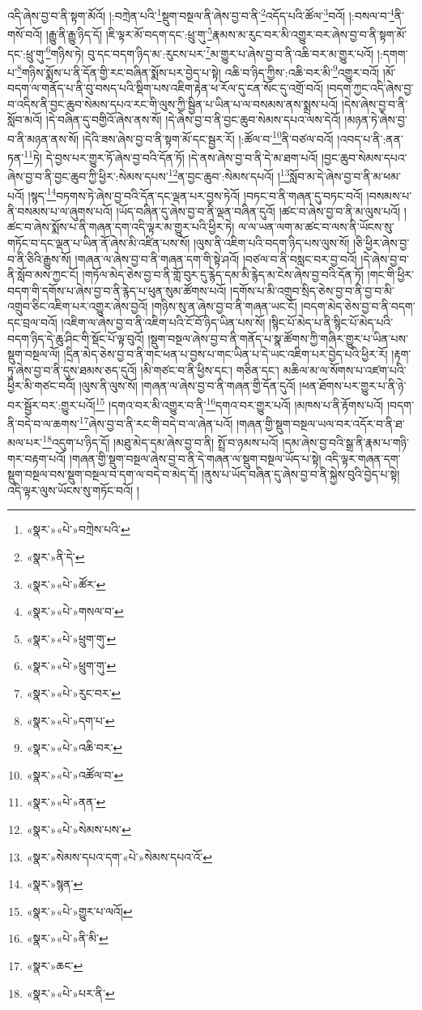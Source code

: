 འདི་ཞེས་བྱ་བ་ནི་སྟག་མོའོ། །:བཀྲེན་པའི་\footnote{«སྣར་»«པེ་»བཀྲེས་པའི་}སྡུག་བསྔལ་ནི་ཞེས་བྱ་བ་ནི་\footnote{«སྣར་»ནི་དེ་}འདོད་པའི་ཚོལ་\footnote{«སྣར་»«པེ་»ཚོར་}བའོ། །:བསལ་བ་\footnote{«སྣར་»«པེ་»གསལ་བ་}ནི་གསོ་བའོ། །རྒྱུ་ནི་རྒྱུ་ཉིད་དོ། །ཇི་ལྟར་མོ་བདག་དང་:ཕྲུ་གུ་\footnote{«སྣར་»«པེ་»ཕྲུག་གུ་}རྣམས་མ་རུང་བར་མི་འགྱུར་བར་ཞེས་བྱ་བ་ནི་སྟག་མོ་དང་:ཕྲུ་གུ་\footnote{«སྣར་»«པེ་»ཕྲུག་གུ་}གཉིས་ཏེ། བུ་དང་བདག་ཉིད་མ་:རུངས་པར་\footnote{«སྣར་»«པེ་»རུང་བར་}མ་གྱུར་པ་ཞེས་བྱ་བ་ནི་འཆི་བར་མ་གྱུར་པའོ། །:དགག་པ་\footnote{«སྣར་»«པེ་»དག་པ་}གཉིས་སྨོས་པ་ནི་དོན་གྱི་རང་བཞིན་སྨོས་པར་བྱེད་པ་སྟེ། འཆི་བ་ཉིད་ཀྱིས་:འཆི་བར་མི་\footnote{«སྣར་»«པེ་»འཆི་བར་}འགྱུར་བའོ། །མོ་བདག་ལ་གནོད་པ་ནི་བུ་བསད་པའི་སྡིག་པས་འཇིག་རྟེན་ཕ་རོལ་དུ་ངན་སོང་དུ་འགྲོ་བའོ། །བདག་ཀྱང་འདི་ཞེས་བྱ་བ་འདིས་ནི་བྱང་ཆུབ་སེམས་དཔའ་རང་གི་ལུས་ཀྱི་སྦྱིན་པ་ཡིན་པ་ལ་བསམས་ནས་སྨྲས་པའོ། །དེས་ཞེས་བྱ་བ་ནི་སློབ་མའོ། །དེ་བཞིན་དུ་བགྱིའོ་ཞེས་ནས་སོ། །དེ་ཞེས་བྱ་བ་ནི་བྱང་ཆུབ་སེམས་དཔའ་ལས་དེའོ། །མཉན་ཏེ་ཞེས་བྱ་བ་ནི་མཉན་ནས་སོ། །དེའི་ཟས་ཞེས་བྱ་བ་ནི་སྟག་མོ་དང་སྦྱར་རོ། །:ཚོལ་བ་\footnote{«སྣར་»«པེ་»འཚོལ་བ་}ནི་བཙལ་བའོ། །འབད་པ་ནི་:ནན་ཏན་\footnote{«སྣར་»«པེ་»ནན་}ཏེ། དེ་བྱས་པར་གྱུར་ཏོ་ཞེས་བྱ་བའི་དོན་ཏོ། །དེ་ནས་ཞེས་བྱ་བ་ནི་དེ་མ་ཐག་པའོ། །བྱང་ཆུབ་སེམས་དཔའ་ཞེས་བྱ་བ་ནི་བྱང་ཆུབ་ཀྱི་ཕྱིར་:སེམས་དཔས་\footnote{«སྣར་»«པེ་»སེམས་པས་}ན་བྱང་ཆུབ་:སེམས་དཔའོ། །\footnote{«སྣར་»སེམས་དཔའ་དག་«པེ་»སེམས་དཔའ་འོ་}སློབ་མ་དེ་ཞེས་བྱ་བ་ནི་མ་ཕམ་པའོ། །སྙད་\footnote{«སྣར་»སྙན་}བཏགས་ཏེ་ཞེས་བྱ་བའི་དོན་དང་ལྡན་པར་བྱས་ཏེའོ། །བཏང་བ་ནི་གཞན་དུ་བཏང་བའོ། །བསམས་པ་ནི་བསམས་པ་ལ་ཞུགས་པའོ། །ཡོད་བཞིན་དུ་ཞེས་བྱ་བ་ནི་ལྡན་བཞིན་དུའོ། །ཚང་བ་ཞེས་བྱ་བ་ནི་མ་ལུས་པའོ། །ཚང་བ་ཞེས་སྨོས་པ་ནི་གཞན་དག་འདི་ལྟར་མ་གྱུར་པའི་ཕྱིར་ཏེ། ལ་ལ་ཡན་ལག་མ་ཚང་བ་ལས་ནི་ཡོངས་སུ་གཏོང་བ་དང་ལྡན་པ་ཡིན་ནོ་ཞེས་མི་འཛིན་པས་སོ། །ལུས་ནི་འཇིག་པའི་བདག་ཉིད་པས་ལུས་སོ། །ཅི་ཕྱིར་ཞེས་བྱ་བ་ནི་ཅིའི་རྒྱུས་སོ། །གཞན་ལ་ཞེས་བྱ་བ་ནི་གཞན་དག་གི་སྟེ་ཤའོ། །བཙལ་བ་ནི་བསླང་བར་བྱ་བའོ། །དེ་ཞེས་བྱ་བ་ནི་སློབ་མས་ཀྱང་ངོ། །གཏོལ་མེད་ཅེས་བྱ་བ་ནི་གློ་བུར་དུ་རྙེད་དམ་མི་རྙེད་མ་ངེས་ཞེས་བྱ་བའི་དོན་ཏོ། །གང་གི་ཕྱིར་བདག་གི་དགོས་པ་ཞེས་བྱ་བ་ནི་རྙེད་པ་ཕུན་སུམ་ཚོགས་པའོ། །དགོས་པ་མི་འགྲུབ་སྲིད་ཅེས་བྱ་བ་ནི་བྱ་བ་མི་འགྲུབ་ཅིང་འཇིག་པར་འགྱུར་ཞེས་བྱའོ། །གཉིས་སུ་ན་ཞེས་བྱ་བ་ནི་གཞན་ཡང་ངོ། །བདག་མེད་ཅེས་བྱ་བ་ནི་བདག་དང་བྲལ་བའོ། །འཇིག་ལ་ཞེས་བྱ་བ་ནི་འཇིག་པའི་ངོ་བོ་ཉིད་ཡིན་པས་སོ། །སྙིང་པོ་མེད་པ་ནི་སྙིང་པོ་མེད་པའི་བདག་ཉིད་དེ་ཆུ་ཤིང་གི་སྡོང་པོ་ལྟ་བུའོ། །སྡུག་བསྔལ་ཞེས་བྱ་བ་ནི་གནོད་པ་སྣ་ཚོགས་ཀྱི་གཞིར་གྱུར་པ་ཡིན་པས་སྡུག་བསྔལ་ལོ། །དྲིན་མེད་ཅེས་བྱ་བ་ནི་གང་ཕན་པ་བྱས་པ་གང་ཡིན་པ་དེ་ཡང་འཇིག་པར་བྱེད་པའི་ཕྱིར་རོ། །རྟག་ཏུ་ཞེས་བྱ་བ་ནི་དུས་ཐམས་ཅད་དུའོ། །མི་གཙང་བ་ནི་ཕྱིས་དང་། གཅིན་དང་། མཆིལ་མ་ལ་སོགས་པ་འཛག་པའི་ཕྱིར་མི་གཙང་བའོ། །ལུས་ནི་ལུས་སོ། །གཞན་ལ་ཞེས་བྱ་བ་ནི་གཞན་གྱི་དོན་དུའོ། །ཕན་ཐོགས་པར་གྱུར་པ་ནི་ཉེ་བར་སྦྱོར་བར་:གྱུར་པའོ།\footnote{«སྣར་»«པེ་»གྱུར་པ་ལའོ།} །དགའ་བར་མི་འགྱུར་བ་ནི་\footnote{«སྣར་»«པེ་»ནི་མི་}དགའ་བར་གྱུར་པའོ། །མཁས་པ་ནི་རྟོགས་པའོ། །བདག་ནི་བདེ་བ་ལ་ཆགས་\footnote{«སྣར་»ཆང་}ཞེས་བྱ་བ་ནི་རང་གི་བདེ་བ་ལ་ཞེན་པའོ། །གཞན་གྱི་སྡུག་བསྔལ་ཡལ་བར་འདོར་བ་ནི་ཐ་མལ་པར་\footnote{«སྣར་»«པེ་»པར་ནི་}འདུག་པ་ཉིད་དོ། །མཐུ་མེད་དམ་ཞེས་བྱ་བ་ནི། སྤྲོ་བ་ཉམས་པའོ། །དམ་ཞེས་བྱ་བའི་སྒྲ་ནི་རྣམ་པ་གཉི་གར་བརྟག་པའོ། །གཞན་གྱི་སྡུག་བསྔལ་ཞེས་བྱ་བ་ནི་དེ་གཞན་ལ་སྡུག་བསྔལ་ཡོད་པ་སྟེ། འདི་ལྟར་གཞན་དག་སྡུག་བསྔལ་བས་སྡུག་བསྔལ་བ་དག་ལ་བདེ་བ་མེད་དོ། །ནུས་པ་ཡོད་བཞིན་དུ་ཞེས་བྱ་བ་ནི་སྐྱེས་བུའི་བྱེད་པ་སྟེ། འདི་ལྟར་ལུས་ཡོངས་སུ་གཏོང་བའོ། །
